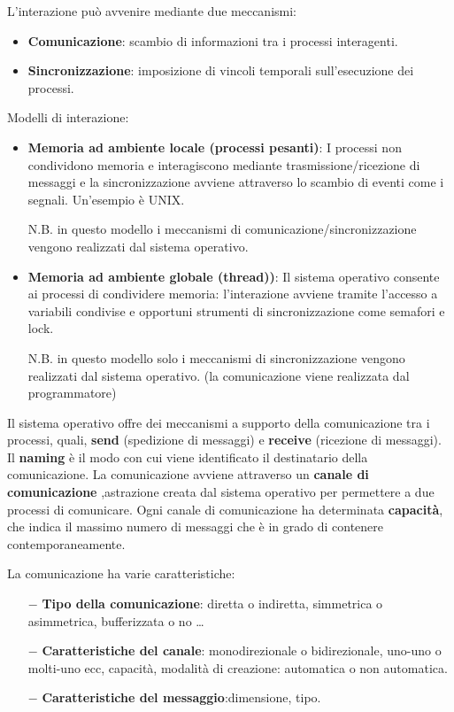 \documentclass{article}
\begin{document}
\noindent L'interazione può avvenire mediante due meccanismi:
\begin{itemize}
    \item \textbf{Comunicazione}: scambio di informazioni tra i 
    processi interagenti.
    \item \textbf{Sincronizzazione}: imposizione di vincoli 
    temporali sull'esecuzione dei processi.
\end{itemize}
\noindent Modelli di interazione:
    \begin{itemize}
    \item \textbf{Memoria ad ambiente locale (processi pesanti)}:
    I processi non condividono memoria e interagiscono mediante
    trasmissione/ricezione di messaggi e la sincronizzazione avviene
     attraverso lo scambio di eventi come i segnali. Un'esempio è UNIX.
     \medskip

    N.B. in questo modello i meccanismi di comunicazione/sincronizzazione
    vengono realizzati dal sistema operativo.

    \item \textbf{Memoria ad ambiente globale (thread))}: Il sistema 
    operativo consente ai processi di condividere memoria: 
    l'interazione avviene tramite l'accesso a variabili condivise e
    opportuni strumenti di sincronizzazione come semafori e lock.
    \medskip

    N.B. in questo modello solo i meccanismi di sincronizzazione 
    vengono realizzati dal sistema operativo. (la comunicazione
     viene realizzata dal programmatore)
\end{itemize}

\noindent Il sistema operativo offre dei meccanismi a supporto della 
comunicazione tra i processi, quali, \textbf{send} (spedizione di messaggi) 
e \textbf{receive} (ricezione di messaggi). Il \textbf{naming} è il 
modo con cui viene identificato il destinatario della comunicazione.
La comunicazione avviene attraverso un \textbf{canale di comunicazione} 
,astrazione creata dal sistema operativo per permettere a due
processi di comunicare. Ogni canale di comunicazione ha determinata
\textbf{capacità}, che indica il massimo numero di messaggi che è
in grado di contenere contemporaneamente.

\noindent La comunicazione ha varie caratteristiche:
\begin{itemize}
    \item[$-$] \textbf{Tipo della comunicazione}: diretta o
    indiretta, simmetrica o asimmetrica, bufferizzata o no \dots
    \item[$-$] \textbf{Caratteristiche del canale}: monodirezionale o
    bidirezionale, uno-uno o molti-uno ecc, capacità, modalità di creazione:
    automatica o non automatica.
    \item[$-$] \textbf{Caratteristiche del messaggio}:dimensione, tipo. 
\end{itemize}
\end{document}
